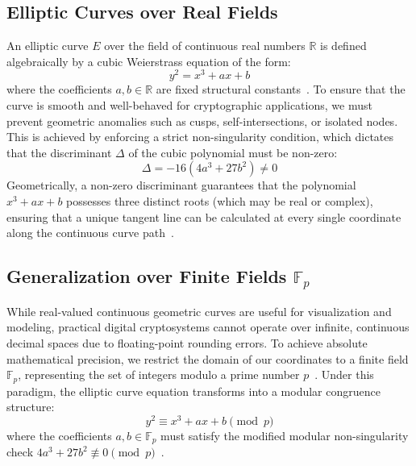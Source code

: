\documentclass[11pt,a4paper]{article}
\begin{document}

\subsection{Elliptic Curves over Real Fields}
An elliptic curve $E$ over the field of continuous real numbers $\mathbb{R}$ is defined algebraically by a cubic Weierstrass equation of the form:
\begin{equation}
    y^2 = x^3 + ax + b
    \label{eq:real_weierstrass}
\end{equation}
where the coefficients $a, b \in \mathbb{R}$ are fixed structural constants~\cite{hoffstein}. To ensure that the curve is smooth and well-behaved for cryptographic applications, we must prevent geometric anomalies such as cusps, self-intersections, or isolated nodes. This is achieved by enforcing a strict non-singularity condition, which dictates that the discriminant $\Delta$ of the cubic polynomial must be non-zero:
\begin{equation}
    \Delta = -16(4a^3 + 27b^2) \neq 0
    \label{eq:discriminant}
\end{equation}
Geometrically, a non-zero discriminant guarantees that the polynomial $x^3 + ax + b$ possesses three distinct roots (which may be real or complex), ensuring that a unique tangent line can be calculated at every single coordinate along the continuous curve path~\cite{washington}.

\subsection{Generalization over Finite Fields $\mathbb{F}_p$}
While real-valued continuous geometric curves are useful for visualization and modeling, practical digital cryptosystems cannot operate over infinite, continuous decimal spaces due to floating-point rounding errors. To achieve absolute mathematical precision, we restrict the domain of our coordinates to a finite field $\mathbb{F}_p$, representing the set of integers modulo a prime number $p$~\cite{washington}. Under this paradigm, the elliptic curve equation transforms into a modular congruence structure:
\begin{equation}
    y^2 \equiv x^3 + ax + b \pmod{p}
    \label{eq:modular_weierstrass}
\end{equation}
where the coefficients $a, b \in \mathbb{F}_p$ must satisfy the modified modular non-singularity check $4a^3 + 27b^2 \not\equiv 0 \pmod{p}$~\cite{hoffstein}. 
\end{document}
